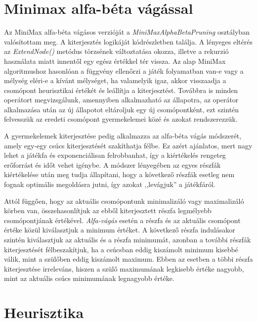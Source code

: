 \documentclass[
]{thesis-ekf}
\theoremstyle{definition}
\theoremstyle{remark}
\begin{document}
\section{Minimax alfa-béta vágással} \label{minimaxalphabeta}

Az MiniMax alfa-béta vágásos verzióját a \emph{MiniMaxAlphaBetaPruning} osztályban valósítottam meg. A kiterjesztés logikáját  kódrészletben találja. A lényeges eltérés az \emph{ExtendNode()} metódus törzsének változtatása okozza, illetve a rekurzió használata miatt innentől egy egész értékkel tér vissza. Az alap MiniMax algoritmushoz hasonlóan a függvény ellenőrzi a játék folyamatban van-e vagy a mélység eléri-e a kívánt mélységet, ha valamelyik igaz, akkor visszaadja a csomópont heurisztikai értékét és leállítja a kiterjesztést. Továbbra is minden operátort megvizsgálunk, amennyiben alkalmazható az állapotra, az operátor alkalmazása után az új állapotot eltároljuk egy új csomópontként, ezt szintén felvesszük az eredeti csomópont gyermekelemei közé és azokat rendszerezzük.

A gyermekelemek kiterjesztése pedig alkalmazza az alfa-béta vágás módszerét, amely egy-egy csúcs kiterjesztését szakíthatja félbe. Ez azért ajánlatos, mert nagy lehet a játékfa és exponenciálisan felrobbanhat, így a kiértékelés rengeteg erőforrást és időt vehet igénybe. A módszer lényegében az egyes részfák kiértékelése után meg tudja állapítani, hogy a következő részfák esetleg nem fognak optimális megoldásra jutni, így azokat ,,levágjuk'' a játékfáról.



Attól függően, hogy az aktuális csomópontunk minimalizáló vagy maximalizáló körben van, összehasonlítjuk az ebből kiterjesztett részfa legmélyebb csomópontjának értékével. \emph{Alfa-vágás} esetén a részfa és az aktuális csomópont értéke közül kiválasztjuk a minimum értéket. A következő részfa indulásakor szintén kiválasztjuk az aktuális és a részfa minimumát, azonban a további részfák kiterjesztését félbeszakítjuk, ha a csúcsban eddig kiszámolt minimum kisebbé válik, mint a szülőben eddig kiszámolt maximum. Ebben az esetben a többi részfa kiterjesztése irreleváns, hiszen a szülő maximumának legkisebb értéke nagyobb, mint az aktuális csúcs minimumának legnagyobb értéke. \cite[5.6. fejezet]{KovasznaiKusper} 

\section{Heurisztika} \label{heuristics}
\end{document}
